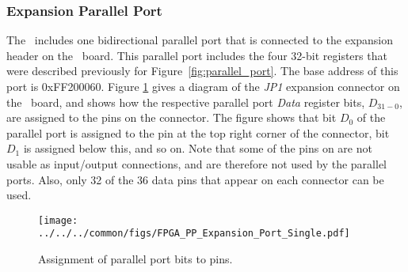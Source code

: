 \subsubsection{Expansion Parallel Port}

The \systemName~includes one bidirectional parallel port that is connected to the
{\it \expansionPortA} expansion header on the \DEBoard~board. This parallel port
includes the four 32-bit registers that were described previously for 
Figure~\ref{fig:parallel_port}. The base address of this port is {\sf 0xFF200060}.
Figure \ref{fig:expansion_port} gives a diagram of 
the {\it JP1} expansion connector on the \DEBoard~board, and shows how the respective parallel port {\it Data} register bits, 
$D_{31-0}$, are assigned to the pins on the connector. The figure shows that bit $D_0$ of
the parallel port is assigned to the pin at the top right corner of the
connector, bit $D_1$ is assigned below this, and so on. Note that some of the pins on
{\it \expansionPortA} are not usable as input/output connections, and are 
therefore not used by the parallel ports. Also, only 32 of the 36 data pins that appear on
each connector can be used.

\begin{figure}[h!]
   \begin{center}
       \texttt{[image: ../../../common/figs/FPGA\_PP\_Expansion\_Port\_Single.pdf]}
   \end{center}
   \caption{Assignment of parallel port bits to pins.}
	\label{fig:expansion_port}
\end{figure}